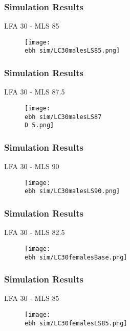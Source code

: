 \documentclass{beamer}
\newcommand{\ebh}{\string~/bio.data/bio.lobster/figures/LFA2733Framework2018/} %
\newcommand{\D}{.}
\begin{document}
\begin{frame}
\frametitle{Simulation Results}
LFA 30 - MLS 85
\begin{figure}
        \begin{center}
            \texttt{[image: \\ebh sim/LC30malesLS85.png]}
        \end{center}
    \end{figure}
\end{frame}


\begin{frame}
\frametitle{Simulation Results}
LFA 30 - MLS 87.5
\begin{figure}
        \begin{center}
            \texttt{[image: \\ebh sim/LC30malesLS87\\D 5.png]}
        \end{center}
    \end{figure}
\end{frame}


\begin{frame}
\frametitle{Simulation Results}
LFA 30 - MLS 90
\begin{figure}
        \begin{center}
            \texttt{[image: \\ebh sim/LC30malesLS90.png]}
        \end{center}
    \end{figure}
\end{frame}





\begin{frame}
\frametitle{Simulation Results}
LFA 30 - MLS 82.5
\begin{figure}
        \begin{center}
            \texttt{[image: \\ebh sim/LC30femalesBase.png]}
        \end{center}
    \end{figure}
\end{frame}



\begin{frame}
\frametitle{Simulation Results}
LFA 30 - MLS 85
\begin{figure}
        \begin{center}
            \texttt{[image: \\ebh sim/LC30femalesLS85.png]}
        \end{center}
    \end{figure}
\end{frame}
\end{document}
